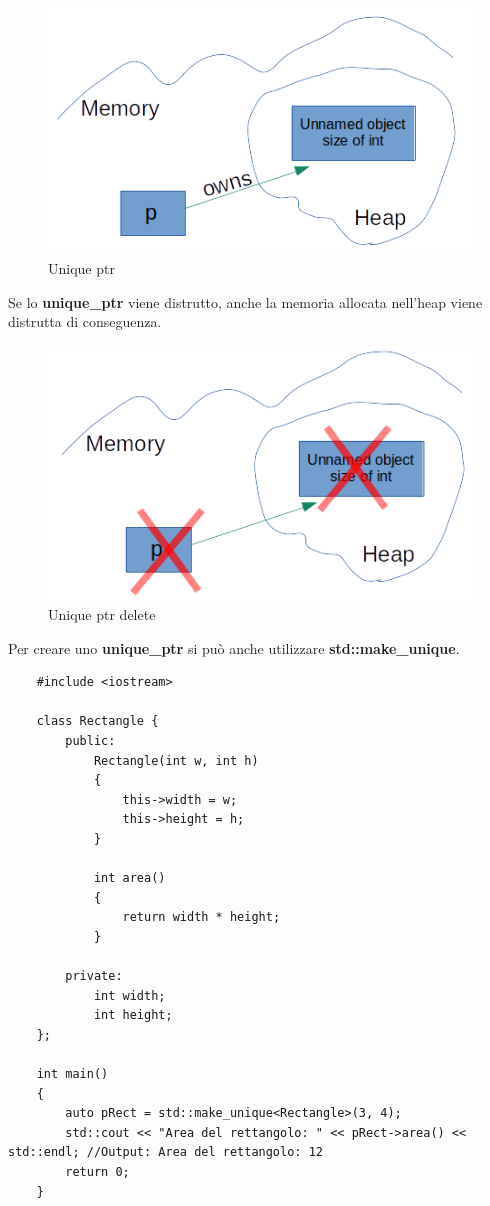 \begin{figure}[H]
	\centering
	\includegraphics[width=1\textwidth, height=1\textheight, keepaspectratio]{./imgs/unique_ptr_definition.png}
	\caption{Unique ptr}
	\label{fig:unique_ptr_definition}
\end{figure}

\textsf{\small Se lo \textbf{unique\_ptr} viene distrutto, anche la memoria allocata nell'heap viene distrutta di conseguenza.} \\

\begin{figure}[H]
	\centering
	\includegraphics[width=1\textwidth, height=1\textheight, keepaspectratio]{./imgs/unique_ptr_delete.png}
	\caption{Unique ptr delete}
	\label{fig:unique_ptr_delete}
\end{figure}

\textsf{\small Per creare uno \textbf{unique\_ptr} si può anche utilizzare \textbf{std::make\_unique}.} \\

\begin{lstlisting}
	#include <iostream>
	
	class Rectangle {
		public:
			Rectangle(int w, int h)
			{
				this->width = w;
				this->height = h;
			}
		
			int area()
			{
				return width * height;
			}
		
		private:
			int width;
			int height;
	};

	int main()
	{
		auto pRect = std::make_unique<Rectangle>(3, 4);
		std::cout << "Area del rettangolo: " << pRect->area() << std::endl; //Output: Area del rettangolo: 12
		return 0;
	}
\end{lstlisting}

